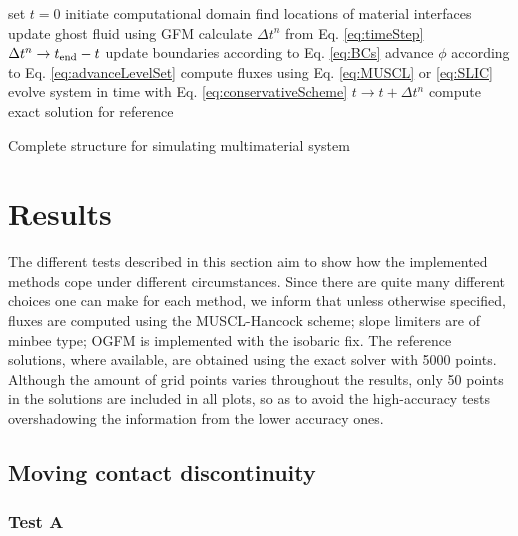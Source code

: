 \documentclass[final,3p,twocolumn]{elsarticle}
\begin{document}
\begin{algorithm}[htb]
    set $t=0$\; 
    initiate computational domain\;
    {
        find locations of material interfaces\;
        {
            update ghost fluid using GFM\;
        }
        calculate $\Delta t^n$ from Eq. \eqref{eq:timeStep}\;
        {
            $\Delta t^n \rightarrow t_{\rm end} - t$ \;
        }
        update boundaries according to Eq. \eqref{eq:BCs}\;
        advance $\phi$ according to Eq. \eqref{eq:advanceLevelSet}\;
        {
            compute fluxes using Eq. \eqref{eq:MUSCL} or \eqref{eq:SLIC}\;
            evolve system in time with Eq.
            \eqref{eq:conservativeScheme}\;
        }
        $t \rightarrow t + \Delta t^n$\;
    }
    {
        compute exact solution for reference\;
    }
    \caption{Complete structure for simulating multimaterial system}
    \label{alg:complete}
\end{algorithm}

\section{Results}
\label{sec:results}

The different tests described in this section aim to show how the implemented
methods cope under different circumstances. Since there are quite many
different choices one can make for each method, we inform that unless otherwise
specified, fluxes are computed using the MUSCL-Hancock scheme; slope limiters
are of minbee type; OGFM is implemented with the isobaric fix. The reference
solutions, where available, are obtained using the exact solver with 5000
points. Although the amount of grid points varies throughout the results, only
50 points in the solutions are included in all plots, so as to avoid the
high-accuracy tests overshadowing the information from the lower accuracy ones.

\subsection{Moving contact discontinuity}
\label{subsec:moving}

\subsubsection{Test A}
\end{document}
